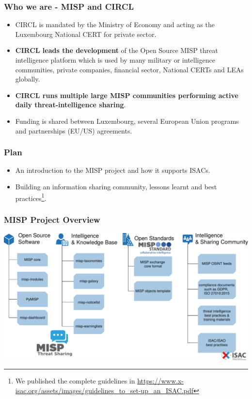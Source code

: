 
\begin{frame}[t,plain]
\titlepage
\end{frame}

\begin{frame}
\frametitle{Who we are - MISP and CIRCL}
\begin{itemize}
\item CIRCL is mandated by the Ministry of Economy and acting as the Luxembourg National CERT for private sector.
\item {\bf CIRCL leads the development} of the Open Source MISP threat intelligence platform which is used by many military or intelligence communities, private companies, financial sector, National CERTs and LEAs globally.
\item {\bf CIRCL runs multiple large MISP communities performing active daily threat-intelligence sharing}.
\item Funding is shared between Luxembourg, several European Union programs and partnerships (EU/US) agreements.
\end{itemize}
\end{frame}
\begin{frame}
	\frametitle{Plan}
	\begin{itemize}
		\item An introduction to the MISP project and how it supports ISACs.
        \item Building an information sharing community, lessons learnt and best practices\footnote{We published the complete guidelines in \url{https://www.x-isac.org/assets/images/guidelines_to_set-up_an_ISAC.pdf}}.
	\end{itemize}
\end{frame}

\begin{frame}
        \frametitle{MISP Project Overview}
        \includegraphics[scale=0.35]{misp-overview-simplified.pdf}
\end{frame}

